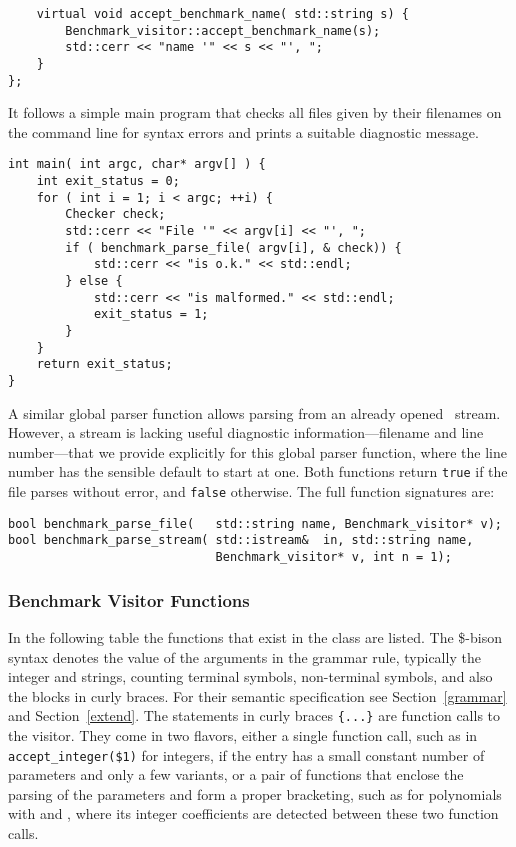\begin{verbatim}
    virtual void accept_benchmark_name( std::string s) {
        Benchmark_visitor::accept_benchmark_name(s);
        std::cerr << "name '" << s << "', ";
    }
};
\end{verbatim}

\noindent
It follows a simple main program that checks all files given by their
filenames on the command line for syntax errors and prints a suitable
diagnostic message.

\begin{verbatim}
int main( int argc, char* argv[] ) {
    int exit_status = 0;
    for ( int i = 1; i < argc; ++i) {
        Checker check;
        std::cerr << "File '" << argv[i] << "', ";
        if ( benchmark_parse_file( argv[i], & check)) {
            std::cerr << "is o.k." << std::endl;
        } else {
            std::cerr << "is malformed." << std::endl;
            exit_status = 1;
        }
    }
    return exit_status;
}
\end{verbatim}

\noindent
A similar global parser function allows parsing from an already opened
\CC\ stream. However, a stream is lacking useful diagnostic
information---filename and line number---that we provide explicitly
for this global parser function, where the line number has the
sensible default to start at one. Both functions return \texttt{true}
if the file parses without error, and \texttt{false} otherwise. The
full function signatures are:

\begin{verbatim}
bool benchmark_parse_file(   std::string name, Benchmark_visitor* v);
bool benchmark_parse_stream( std::istream&  in, std::string name, 
                             Benchmark_visitor* v, int n = 1);
\end{verbatim}


\subsubsection{Benchmark Visitor Functions\label{functions}}

In the following table the functions that exist in the
 class are listed.  The \$-bison syntax
denotes the value of the arguments in the grammar rule, typically the
integer and strings, counting terminal symbols, non-terminal symbols,
and also the blocks in curly braces.  For their semantic specification
see Section~\ref{grammar} and Section~\ref{extend}.  The statements in
curly braces 
\texttt{\{...\}}
are function calls to the visitor.
They come in two flavors, either a single function call, such as in
\texttt{accept\_integer(\$1)} for integers, if the entry has a small
constant number of parameters and only a few variants, or a pair of
functions that enclose the parsing of the parameters and form a proper
bracketing, such as for polynomials with
 and ,
where its integer coefficients are detected between these two function
calls. 

